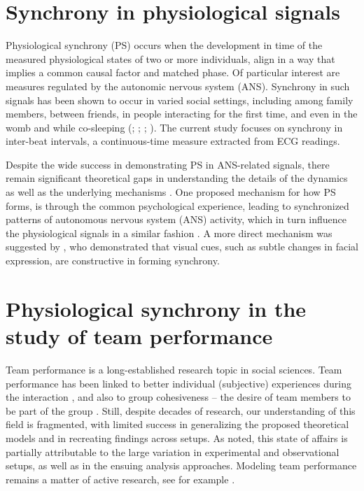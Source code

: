 \documentclass[a4paper, 11pt]{report}      %
\begin{document}
\section{Synchrony in physiological signals}
Physiological synchrony (PS) occurs when the development in time of the measured physiological states of two or more individuals, align in a way that implies a common causal factor and matched phase. Of particular interest are measures regulated by the autonomic nervous system (ANS). Synchrony in such signals has been shown to occur in varied social settings, including among family members, between friends, in people interacting for the first time, and even in the womb and while co-sleeping (\cite{palumbo2017interpersonal}; \cite{jar202physiological}; \cite{ivanov2009maternal}; \cite{yoon2019human}). The current study focuses on synchrony in  inter-beat intervals, a continuous-time measure extracted from ECG readings. 

Despite the wide success in demonstrating PS in ANS-related signals,  there remain significant theoretical gaps in understanding the details of the dynamics as well as the underlying mechanisms  \citep{jar202physiological}. 
One proposed mechanism for how PS forms, is through the common psychological experience, leading to synchronized patterns of autonomous nervous system (ANS) activity, which in turn influence the physiological signals in a similar fashion \citep{palumbo2017interpersonal}. A more direct mechanism was suggested by \citet{behrens2020physiological}, who 
demonstrated that visual cues, such as subtle changes in facial expression, are constructive in forming synchrony. 

\section{Physiological synchrony in the study of team performance}
Team performance is a long-established research topic in social sciences. Team performance has been linked to better individual (subjective) experiences during the interaction \citep{lodahl1961psychometric}, and also to group cohesiveness -- the desire of team members to be part of the group \citep{cartwright1968nature}. Still, despite decades of research, our understanding of this field is fragmented, with limited success in generalizing the proposed theoretical models and in recreating findings across setups. As  \citet{beal2003cohesion} noted, this state of affairs is partially attributable to the large variation in experimental and observational setups, as well as in the ensuing analysis approaches. Modeling team performance remains a matter of active research, see for example \citet{collins2019explorations}.
\end{document}

